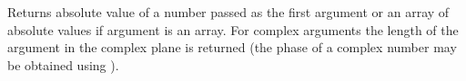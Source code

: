Returns absolute value of a number passed as the first argument
or an array of absolute values if argument is an array. 
For complex arguments the length of the argument in the complex plane is returned
(the phase of a complex number may be obtained using ).
